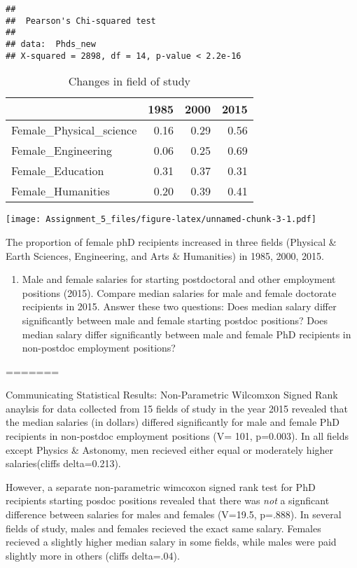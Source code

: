 \documentclass[]{article}
\providecommand{\tightlist}{%
  \setlength{\itemsep}{0pt}\setlength{\parskip}{0pt}}
\begin{document}
\begin{verbatim}
## 
##  Pearson's Chi-squared test
## 
## data:  Phds_new
## X-squared = 2898, df = 14, p-value < 2.2e-16
\end{verbatim}

\begin{table}

\caption{\label{tab:unnamed-chunk-3}Changes in field of study }
\centering
\begin{tabular}[t]{l|r|r|r}
\hline
  & 1985 & 2000 & 2015\\
\hline
Female\_Physical\_science & 0.16 & 0.29 & 0.56\\
\hline
Female\_Engineering & 0.06 & 0.25 & 0.69\\
\hline
Female\_Education & 0.31 & 0.37 & 0.31\\
\hline
Female\_Humanities & 0.20 & 0.39 & 0.41\\
\hline
\end{tabular}
\end{table}

\texttt{[image: Assignment\_5\_files/figure-latex/unnamed-chunk-3-1.pdf]}

The proportion of female phD recipients increased in three fields
(Physical \& Earth Sciences, Engineering, and Arts \& Humanities) in
1985, 2000, 2015.

\begin{enumerate}
\def\labelenumi{\arabic{enumi}.}
\setcounter{enumi}{2}
\tightlist
\item
  Male and female salaries for starting postdoctoral and other
  employment positions (2015). Compare median salaries for male and
  female doctorate recipients in 2015. Answer these two questions: Does
  median salary differ significantly between male and female starting
  postdoc positions? Does median salary differ significantly between
  male and female PhD recipients in non-postdoc employment positions?
\end{enumerate}

=======

Communicating Statistical Results: Non-Parametric Wilcomxon Signed Rank
anaylsis for data collected from 15 fields of study in the year 2015
revealed that the median salaries (in dollars) differed significantly
for male and female PhD recipients in non-postdoc employment positions
(V= 101, p=0.003). In all fields except Physics \& Astonomy, men
recieved either equal or moderately higher salaries(cliffs delta=0.213).

However, a separate non-parametric wimcoxon signed rank test for PhD
recipients starting posdoc positions revealed that there was \emph{not}
a signficant difference between salaries for males and females (V=19.5,
p=.888). In several fields of study, males and females recieved the
exact same salary. Females recieved a slightly higher median salary in
some fields, while males were paid slightly more in others (cliffs
delta=.04).
\end{document}
